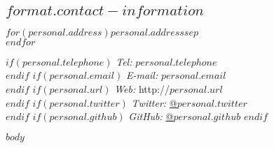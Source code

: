 \documentclass[$for(format.pdf-options.style)$$format.pdf-options.style$$sep$,$endfor$]{res}
\date{$date$}
\renewcommand{\subsection}[1]{\section{\sc{#1}}} %
\renewcommand{\subsection}[1]{\section{#1}} %
\begin{document}
  \begin{resume}
  \hypertarget{contact-information}{
  \subsection{$format.contact-information$}\label{contact-information}}
    \begin{minipage}[t]{0.3\textwidth}
      $for(personal.address)$$personal.address$$sep$\\ $endfor$
    \end{minipage}
    \begin{minipage}[t]{0.7\textwidth}
        $if(personal.telephone)$
        {\it Tel:} $personal.telephone$ \\
        $endif$
        $if(personal.email)$
        {\it E-mail:} $personal.email$ \\
        $endif$
        $if(personal.url)$
        {\it Web:} http://$personal.url$ \\
        $endif$
        $if(personal.twitter)$
        {\it Twitter:} \href{http://twitter.com/$personal.twitter$}{@$personal.twitter$} \\
        $endif$
        $if(personal.github)$
        {\it GitHub:} \href{http://github.com/$personal.github$}{@$personal.github$}
        $endif$
    \end{minipage}
\vspace{-\baselineskip} %
$body$
  \end{resume}
\end{document}
